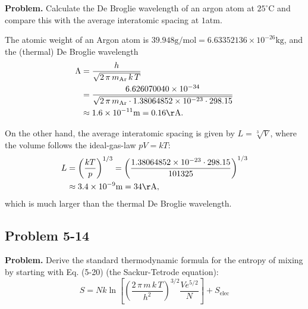 \documentclass[twocolumn, 10pt]{article}
\numberwithin{equation}{section}
\newenvironment{problem}
{\par\medskip\sffamily \color{problue}
  \textbf{Problem. }\ignorespaces}
{\medskip}
\newenvironment{solution}[1][\empty]
{\par\medskip
  \textbf{\ifx\empty#1{Solution.}\relax\else{#1}\fi} \ignorespaces}
{\medskip}
\begin{document}
\begin{problem}
  Calculate the De Broglie wavelength of an argon atom at $25^{\circ}$C
  and compare this with the average interatomic spacing at $1$atm.
\end{problem}

\begin{solution}
The atomic weight of an Argon atom is
$39.948 \mathrm{g/mol} = 6.63352136\times 10^{-26} \mathrm{kg}$,
and the (thermal) De Broglie wavelength
\begin{align*}
\Lambda
  &= \frac{h}{ \sqrt{2\,\pi\,m_\mathrm{Ar}\,k\,T} }
  \\
  &= \frac{ 6.626070040 \times 10^{-34} }
  { \sqrt{2 \, \pi \, m_\mathrm{Ar} \cdot 1.38064852 \times 10^{-23} \cdot 298.15} }
  \\
  &\approx 1.6\times10^{-11}\mathrm{m} = 0.16\mathrm{\AA}.
\end{align*}

On the other hand,
the average interatomic spacing
  is given by $L = \sqrt[3]{V}$,
where the volume follows the ideal-gas-law $pV = kT$:
\begin{align*}
  L
  &= \left(\frac{ kT } { p} \right)^{1/3}
  = \left(
  \frac{ 1.38064852 \times 10^{-23} \cdot 298.15 }
  { 101325 } \right)^{1/3}
  \\
  &\approx 3.4\times10^{-9} \mathrm{m}
  = 34\mathrm{\AA},
\end{align*}
which is much larger than the thermal De Broglie wavelength.
%
\end{solution}

\subsection{Problem 5-14}

\begin{problem}
  Derive the standard thermodynamic formula for the entropy of mixing
  by starting with Eq. (5-20) (the Sackur-Tetrode equation):
  \begin{equation}
    S = N k \ln \left[
      \left( \frac{ 2 \, \pi \, m \, k \, T } { h^2 }
      \right)^{3/2}
      \frac{ V e^{5/2} } { N }
      \right] + S_\mathrm{elec}
    \tag{5-20}
    \label{eq:Sstd}
  \end{equation}
\end{problem}
\end{document}
